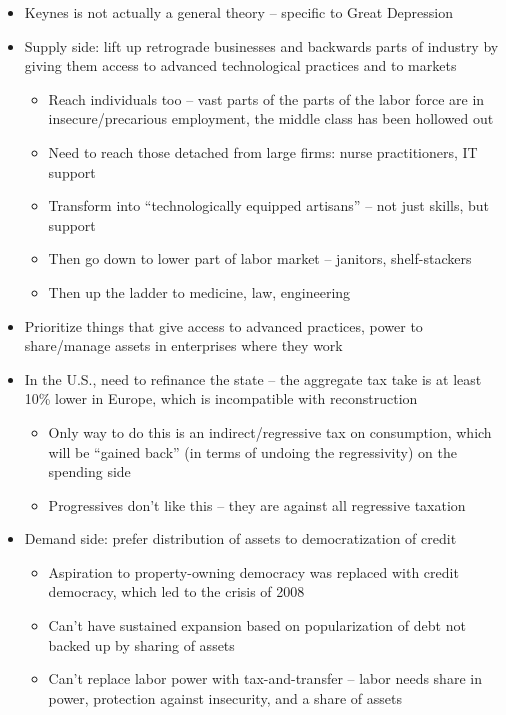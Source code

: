 \begin{itemize}
  \begin{itemize}
  \tightlist
  \item
    Keynes is not actually a general theory -- specific to Great
    Depression
  \item
    Supply side: lift up retrograde businesses and backwards parts of
    industry by giving them access to advanced technological practices
    and to markets

    \begin{itemize}
    \tightlist
    \item
      Reach individuals too -- vast parts of the parts of the labor
      force are in insecure/precarious employment, the middle class has
      been hollowed out
    \item
      Need to reach those detached from large firms: nurse
      practitioners, IT support
    \item
      Transform into ``technologically equipped artisans'' -- not just
      skills, but support
    \item
      Then go down to lower part of labor market -- janitors,
      shelf-stackers
    \item
      Then up the ladder to medicine, law, engineering
    \end{itemize}
  \item
    Prioritize things that give access to advanced practices, power to
    share/manage assets in enterprises where they work
  \item
    In the U.S., need to refinance the state -- the aggregate tax take
    is at least 10\% lower in Europe, which is incompatible with
    reconstruction

    \begin{itemize}
    \tightlist
    \item
      Only way to do this is an indirect/regressive tax on consumption,
      which will be ``gained back'' (in terms of undoing the
      regressivity) on the spending side
    \item
      Progressives don't like this -- they are against all regressive
      taxation
    \end{itemize}
  \item
    Demand side: prefer distribution of assets to democratization of
    credit

    \begin{itemize}
    \tightlist
    \item
      Aspiration to property-owning democracy was replaced with credit
      democracy, which led to the crisis of 2008
    \item
      Can't have sustained expansion based on popularization of debt not
      backed up by sharing of assets
    \item
      Can't replace labor power with tax-and-transfer -- labor needs
      share in power, protection against insecurity, and a share of
      assets
    \end{itemize}
  \end{itemize}
\end{itemize}

